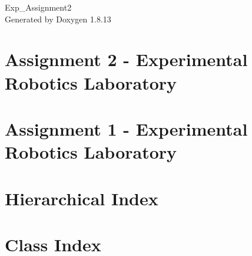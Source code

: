 \documentclass[twoside]{book}
\newcommand{\+}{\discretionary{\mbox{\scriptsize$\hookleftarrow$}}{}{}}
\newcommand{\clearemptydoublepage}{%
  \newpage{\pagestyle{empty}\cleardoublepage}%
}
\begin{document}
\hypersetup{pageanchor=false,
             bookmarksnumbered=true,
             pdfencoding=unicode
            }
\begin{titlepage}
\vspace*{7cm}
\begin{center}%
{\Large Exp\+\_\+\+Assignment2 }\\
\vspace*{1cm}
{\large Generated by Doxygen 1.8.13}\\
\end{center}
\end{titlepage}
\clearemptydoublepage
{}
\tableofcontents
\clearemptydoublepage
{}
\hypersetup{pageanchor=true}

\chapter{Assignment 2 -\/ Experimental Robotics Laboratory}
\label{md_README}

\chapter{Assignment 1 -\/ Experimental Robotics Laboratory}
\label{md__home_sara_Scrivania_Assignment1_Exp_Ro_Lab_README}

\chapter{Hierarchical Index}

\chapter{Class Index}

\end{document}
